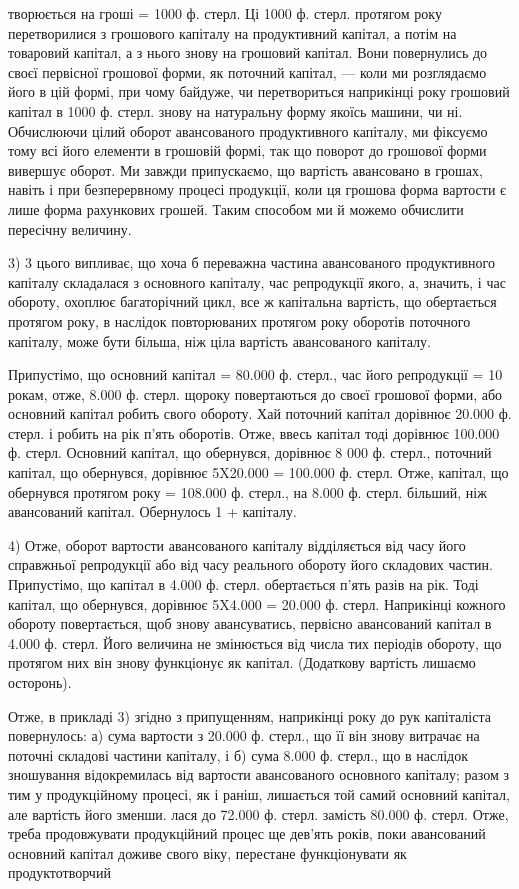 \parcont{}  %
творюється на гроші  = 1000 ф. стерл. Ці 1000 ф. стерл. протягом року
перетворилися з грошового капіталу на продуктивний капітал, а потім на
товаровий капітал, а з нього знову на грошовий капітал. Вони повернулись
до своєї первісної грошової форми, як поточний капітал, — коли ми
розглядаємо його в цій формі, при чому байдуже, чи перетвориться наприкінці
року грошовий капітал в 1000 ф. стерл. знову на натуральну
форму якоїсь машини, чи ні. Обчислюючи цілий оборот авансованого продуктивного
капіталу, ми фіксуємо тому всі його елементи в грошовій формі,
так що поворот до грошової форми вивершує оборот. Ми завжди припускаємо,
що вартість авансовано в грошах, навіть і при безперервному
процесі продукції, коли ця грошова форма вартости є лише форма
рахункових грошей. Таким способом ми й можемо обчислити пересічну
величину.

3) 3 цього випливає, що хоча б переважна частина авансованого
продуктивного капіталу складалася з основного капіталу, час репродукції
якого, а, значить, і час обороту, охоплює багаторічний цикл, все ж капітальна
вартість, що обертається протягом року, в наслідок повторюваних
протягом року оборотів поточного капіталу, може бути більша, ніж ціла
вартість авансованого капіталу.

Припустімо, що основний капітал = 80.000 ф. стерл., час його репродукції
= 10 рокам, отже, 8.000 ф. стерл. щороку повертаються до своєї
грошової форми, або основний капітал робить  свого обороту. Хай
поточний капітал дорівнює 20.000 ф. стерл. і робить на рік п’ять оборотів.
Отже, ввесь капітал тоді дорівнює 100.000 ф. стерл. Основний
капітал, що обернувся, дорівнює 8 000 ф. стерл., поточний капітал, що
обернувся, дорівнює 5X20.000 = 100.000 ф. стерл. Отже, капітал, що
обернувся протягом року = 108.000 ф. стерл., на 8.000 ф. стерл. більший,
ніж авансований капітал. Обернулось 1 +  капіталу.

4) Отже, оборот вартости авансованого капіталу відділяється
від часу його справжньої репродукції або від часу реального обороту
його складових частин. Припустімо, що капітал в 4.000 ф. стерл. обертається
п’ять разів на рік. Тоді капітал, що обернувся, дорівнює
5X4.000 = 20.000 ф. стерл. Наприкінці кожного обороту повертається,
щоб знову авансуватись, первісно авансований капітал в 4.000 ф. стерл.
Його величина не змінюється від числа тих періодів обороту, що
протягом них він знову функціонує як капітал. (Додаткову вартість
лишаємо осторонь).

Отже, в прикладі 3) згідно з припущенням, наприкінці року до рук
капіталіста повернулось: а) сума вартости з 20.000 ф. стерл., що її він
знову витрачає на поточні складові частини капіталу, і б) сума 8.000 ф.
стерл., що в наслідок зношування відокремилась від вартости авансованого
основного капіталу; разом з тим у продукційному процесі, як і
раніш, лишається той самий основний капітал, але вартість його зменши.
лася до 72.000 ф. стерл. замість 80.000 ф. стерл. Отже, треба продовжувати
продукційний процес ще дев’ять років, поки авансований основний
капітал доживе свого віку, перестане функціонувати як продуктотворчий
\parbreak{}  %
